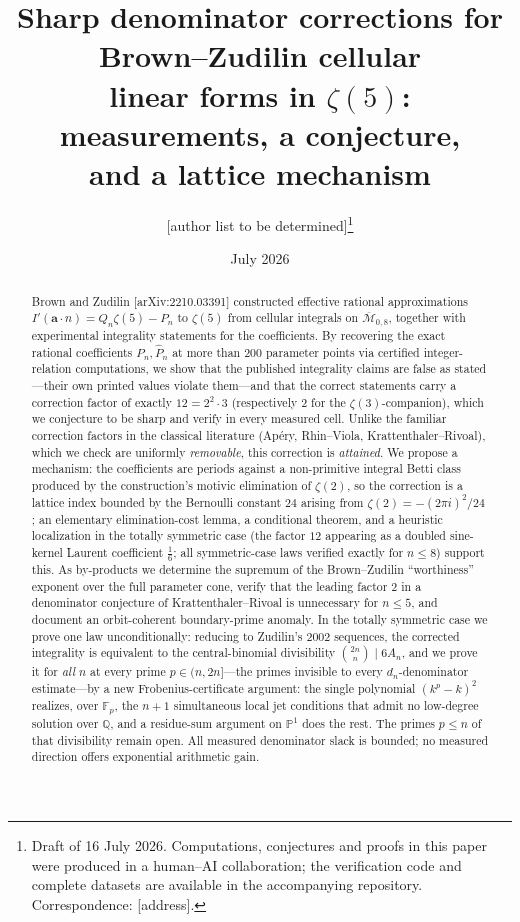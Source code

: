 \documentclass[11pt]{article}
\title{Sharp denominator corrections for Brown--Zudilin cellular\\
linear forms in $\zeta(5)$: measurements, a conjecture,\\ and a lattice
mechanism}
\author{[author list to be determined]\thanks{Draft of 16 July 2026.
Computations, conjectures and proofs in this paper were produced in a
human--AI collaboration; the verification code and complete datasets are
available in the accompanying repository. Correspondence: [address].}}
\date{July 2026}
\theoremstyle{definition}
\newcommand{\Q}{\mathbb{Q}}
\begin{document}
\maketitle

\begin{abstract}
Brown and Zudilin [arXiv:2210.03391] constructed effective rational
approximations $I'(\mathbf{a}\cdot n)=Q_n\zeta(5)-P_n$ to $\zeta(5)$ from
cellular integrals on $\overline{\mathcal M}_{0,8}$, together with
experimental integrality statements for the coefficients. By recovering
the exact rational coefficients $P_n,\hat P_n$ at more than $200$
parameter points via certified integer-relation computations, we show
that the published integrality claims are false as stated---their own
printed values violate them---and that the correct statements carry a
correction factor of exactly $12=2^2\cdot 3$ (respectively $2$ for the
$\zeta(3)$-companion), which we conjecture to be sharp and verify in
every measured cell. Unlike the familiar correction factors in the
classical literature (Ap\'ery, Rhin--Viola, Krattenthaler--Rivoal),
which we check are uniformly \emph{removable}, this correction is
\emph{attained}. We propose a mechanism: the coefficients are periods
against a non-primitive integral Betti class produced by the
construction's motivic elimination of $\zeta(2)$, so the correction is a
lattice index bounded by the Bernoulli constant $24$ arising from
$\zeta(2)=-(2\pi i)^2/24$; an elementary elimination-cost lemma, a
conditional theorem, and a heuristic localization in the totally
symmetric case (the factor $12$ appearing as a doubled sine-kernel
Laurent coefficient $\tfrac16$; all symmetric-case laws verified exactly
for $n\le8$) support this. As by-products we determine the
supremum of the Brown--Zudilin ``worthiness'' exponent over the full
parameter cone, verify that the leading factor $2$ in a denominator
conjecture of Krattenthaler--Rivoal is unnecessary for $n\le 5$, and
document an orbit-coherent boundary-prime anomaly. In the totally
symmetric case we prove one law unconditionally: reducing to Zudilin's
2002 sequences, the corrected integrality is equivalent to the
central-binomial divisibility $\binom{2n}{n}\mid 6A_n$, and we prove it
for \emph{all} $n$ at every prime $p\in(n,2n]$---the primes invisible
to every $d_n$-denominator estimate---by a new Frobenius-certificate
argument: the single polynomial $(k^p-k)^2$ realizes, over
$\mathbb{F}_p$, the $n+1$ simultaneous local jet conditions that admit
no low-degree solution over $\Q$, and a residue-sum argument on
$\mathbb{P}^1$ does the rest. The primes $p\le n$ of that divisibility
remain open. All measured denominator slack is bounded; no measured
direction offers exponential arithmetic gain.
\end{abstract}
\end{document}
